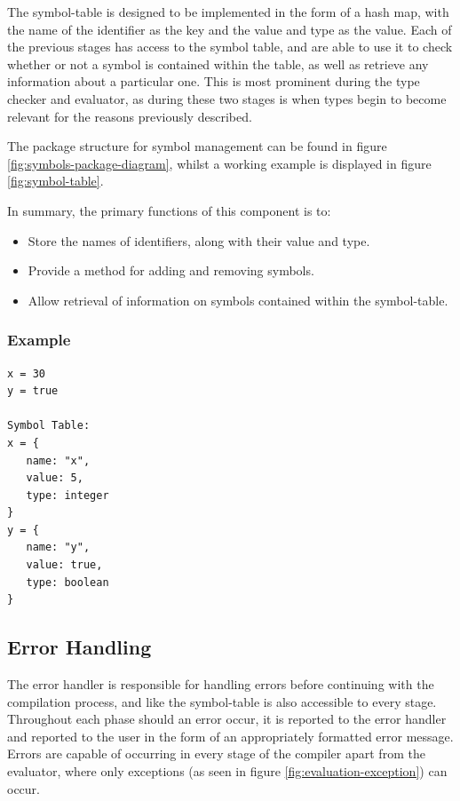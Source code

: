 \documentclass[
]{report}
\begin{document}
The \gls{symbol-table} is designed to be implemented in the form of a hash
map, with the name of the \gls{identifier} as the key and the value and type
as the value. Each of the previous stages has access to the symbol
table, and are able to use it to check whether or not a \gls{symbol} is
contained within the table, as well as retrieve any information about a
particular one. This is most prominent during the type checker and
evaluator, as during these two stages is when types begin to become
relevant for the reasons previously described.

The package structure for symbol management can be found in figure \ref{fig:symbols-package-diagram},
whilst a working example is displayed in figure \ref{fig:symbol-table}.

In summary, the primary functions of this component is to: 
\begin{itemize}
	\item Store the names of \glspl{identifier}, along with their value and type.
	\item Provide a method for adding and removing \glspl{symbol}.
	\item Allow retrieval of information on \glspl{symbol} contained within the \gls{symbol-table}.
\end{itemize}

\subsubsection{Example}
\begin{verbatim}
x = 30
y = true

Symbol Table:
x = {
   name: "x",
   value: 5,
   type: integer
}
y = {
   name: "y",
   value: true,
   type: boolean
}
\end{verbatim}

\subsection{Error Handling}
The error handler is responsible for handling errors before continuing
with the compilation process, and like the \gls{symbol-table} is also
accessible to every stage. Throughout each phase should an error occur,
it is reported to the error handler and reported to the user in the form
of an appropriately formatted error message. Errors are capable of
occurring in every stage of the compiler apart from the evaluator,
where only exceptions (as seen in figure \ref{fig:evaluation-exception}) can occur.
\end{document}
